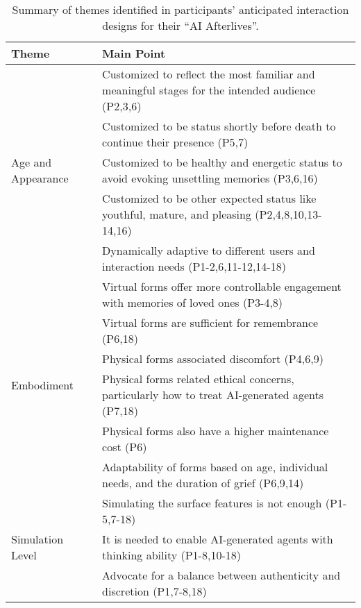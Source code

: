 \begin{table*}[htbp]
  \caption{Summary of themes identified in participants' anticipated interaction designs for their ``AI Afterlives''.}
  \label{tab:summary of themes and main points in interaction}
  \begin{tabular}{p{}p{}}
    \toprule
    \textbf{Theme} & \textbf{Main Point} \\
    \midrule
    \multirow{5}{=}{Age and Appearance} 
            & Customized to reflect the most familiar and meaningful stages for the intended audience (P2,3,6) \\ %
             & \cellcolor{gray!15}Customized to be status shortly before death to continue their presence (P5,7)  \\ %
             & Customized to be healthy and energetic status to avoid evoking unsettling memories (P3,6,16) \\ %
             & \cellcolor{gray!15}Customized to be other expected status like youthful, mature, and pleasing (P2,4,8,10,13-14,16) \\ %
             & Dynamically adaptive to different users and interaction needs (P1-2,6,11-12,14-18) \\
    \hline
    \multirow{6}{=}{Embodiment} 
            & \cellcolor{gray!15}Virtual forms offer more controllable engagement with memories of loved ones (P3-4,8) \\ %
            & Virtual forms are sufficient for remembrance (P6,18) \\ %
             & \cellcolor{gray!15}Physical forms associated discomfort (P4,6,9)  \\ %
             & Physical forms related ethical concerns, particularly how to treat AI-generated agents (P7,18) \\ %
             & \cellcolor{gray!15}Physical forms also have a higher maintenance cost (P6) \\
             & Adaptability of forms based on age, individual needs, and the duration of grief (P6,9,14) \\
    \hline
    \multirow{3}{=}{Simulation Level} 
            & \cellcolor{gray!15}Simulating the surface features is not enough (P1-5,7-18) \\ %
             & It is needed to enable AI-generated agents with thinking ability (P1-8,10-18) \\ %
             & \cellcolor{gray!15}Advocate for a balance between authenticity and discretion (P1,7-8,18) \\

\end{tabular}
\end{table*}
